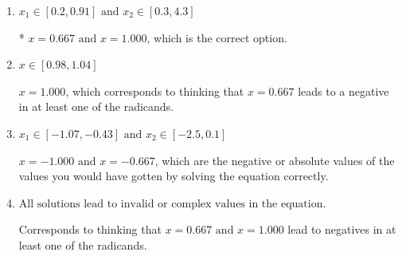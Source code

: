 \documentclass{extbook}[14pt]
\begin{document}
\begin{enumerate}
{\begin{enumerate}[label=\Alph*.]
$x = 0.667$, which corresponds to thinking that $x = 1.000$ leads to a negative in at least one of the radicands.
\item \( x_1 \in [0.2, 0.91] \text{ and } x_2 \in [0.3,4.3] \)

* $x = 0.667 \text{ and } x = 1.000$, which is the correct option.
\item \( x \in [0.98,1.04] \)

$x = 1.000$, which corresponds to thinking that $x = 0.667$ leads to a negative in at least one of the radicands.
\item \( x_1 \in [-1.07, -0.43] \text{ and } x_2 \in [-2.5,0.1] \)

$x = -1.000 \text{ and } x = -0.667$, which are the negative or absolute values of the values you would have gotten by solving the equation correctly.
\item \( \text{All solutions lead to invalid or complex values in the equation.} \)

Corresponds to thinking that $x = 0.667 \text{ and } x = 1.000$ lead to negatives in at least one of the radicands.
\end{enumerate}

}
\end{enumerate}
\end{document}
